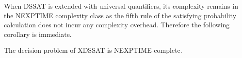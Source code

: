 When DSSAT is extended with universal quantifiers,
its complexity remains in the NEXPTIME complexity class
as the fifth rule of the satisfying probability calculation does not incur any complexity overhead.
Therefore the following corollary is immediate.
\begin{corollary}
    The decision problem of XDSSAT is NEXPTIME-complete.
\end{corollary}
